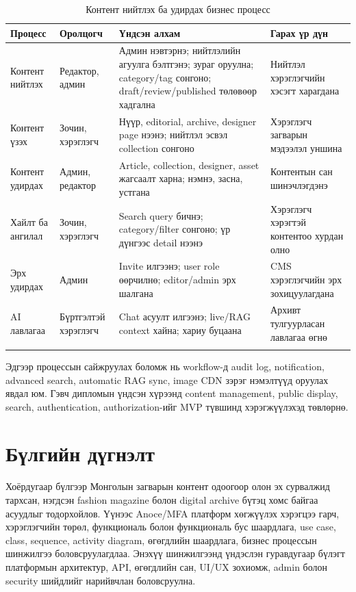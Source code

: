 \begin{longtable}{|L{0.18\textwidth}|L{0.16\textwidth}|L{0.32\textwidth}|L{0.16\textwidth}|}
  \hline
  \textbf{Процесс} & \textbf{Оролцогч} & \textbf{Үндсэн алхам} & \textbf{Гарах үр дүн} \\ \hline
  Контент нийтлэх & Редактор, админ & Админ нэвтэрнэ; нийтлэлийн агуулга бэлтгэнэ; зураг оруулна; category/tag сонгоно; draft/review/published төлөвөөр хадгална & Нийтлэл хэрэглэгчийн хэсэгт харагдана \\ \hline
  Контент үзэх & Зочин, хэрэглэгч & Нүүр, editorial, archive, designer page нээнэ; нийтлэл эсвэл collection сонгоно & Хэрэглэгч загварын мэдээлэл уншина \\ \hline
  Контент удирдах & Админ, редактор & Article, collection, designer, asset жагсаалт харна; нэмнэ, засна, устгана & Контентын сан шинэчлэгдэнэ \\ \hline
  Хайлт ба ангилал & Зочин, хэрэглэгч & Search query бичнэ; category/filter сонгоно; үр дүнгээс detail нээнэ & Хэрэглэгч хэрэгтэй контентоо хурдан олно \\ \hline
  Эрх удирдах & Админ & Invite илгээнэ; user role өөрчилнө; editor/admin эрх шалгана & CMS хэрэглэгчийн эрх зохицуулагдана \\ \hline
  AI лавлагаа & Бүртгэлтэй хэрэглэгч & Chat асуулт илгээнэ; live/RAG context хайна; хариу буцаана & Архивт тулгуурласан лавлагаа өгнө \\ \hline
  \caption{Контент нийтлэх ба удирдах бизнес процесс}
  \label{tab:business-process-ch2}\\
\end{longtable}

Эдгээр процессын сайжруулах боломж нь workflow-д audit log, notification, advanced search, automatic RAG sync, image CDN зэрэг нэмэлтүүд оруулах явдал юм. Гэвч дипломын үндсэн хүрээнд content management, public display, search, authentication, authorization-ийг MVP түвшинд хэрэгжүүлэхэд төвлөрнө.

\section*{Бүлгийн дүгнэлт}

Хоёрдугаар бүлгээр Монголын загварын контент одоогоор олон эх сурвалжид тархсан, нэгдсэн fashion magazine болон digital archive бүтэц хомс байгаа асуудлыг тодорхойлов. Үүнээс Anoce/MFA платформ хөгжүүлэх хэрэгцээ гарч, хэрэглэгчийн төрөл, функциональ болон функциональ бус шаардлага, use case, class, sequence, activity diagram, өгөгдлийн шаардлага, бизнес процессын шинжилгээ боловсруулагдлаа. Энэхүү шинжилгээнд үндэслэн гуравдугаар бүлэгт платформын архитектур, API, өгөгдлийн сан, UI/UX зохиомж, admin болон security шийдлийг нарийвчлан боловсруулна.
